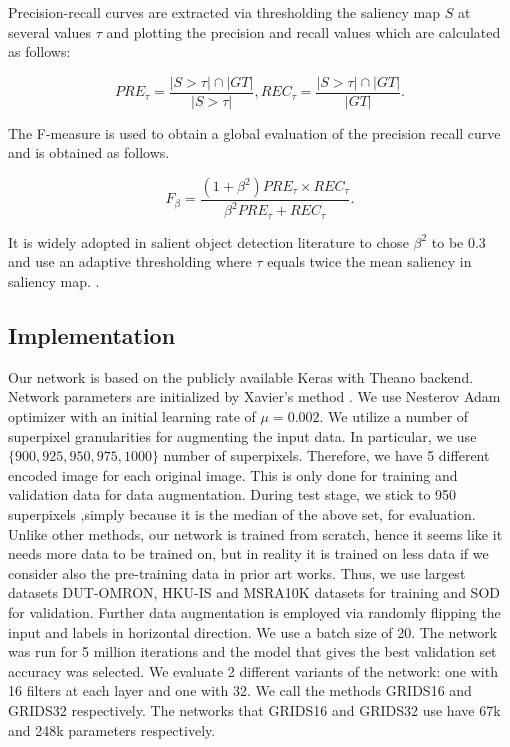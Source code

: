 \documentclass[a4paper,conference]{IEEEtran}
\begin{document}
Precision-recall curves are extracted via thresholding the saliency map $S$ at several values $\tau$ and plotting the precision and recall values which are calculated as follows:

\begin{equation}
PRE_\tau=\frac{|S>\tau|\cap|GT|}{|S>\tau|},  REC_\tau=\frac{|S>\tau|\cap|GT|}{|GT|}.
\label{eqn4}
\end{equation}

The F-measure is used to obtain a global evaluation of the precision recall curve and is obtained as follows.

\begin{equation}
F_\beta=\frac{(1+\beta^2)PRE_\tau \times REC_\tau}{\beta^2PRE_\tau+REC_\tau}.
\label{eqn5}
\end{equation}

It is widely adopted in salient object detection literature to chose $\beta^2$ to be $0.3$ and use an adaptive thresholding where $\tau$ equals twice the mean saliency in saliency map. \cite{Borji1}.

\subsection{Implementation}
Our network is based on the publicly available Keras with Theano backend.
Network parameters are initialized by Xavier's method \cite{Xavier}. 
We use Nesterov Adam optimizer with an initial learning rate of $\mu=0.002$.
We utilize a number of superpixel granularities for augmenting the input data. 
In particular, we use $\{900,925,950,975,1000\}$ number of superpixels.
Therefore, we have 5 different encoded image for each original image.
This is only done for training and validation data for data augmentation.
During test stage, we stick to 950 superpixels ,simply because it is the median of the above set, for evaluation.
Unlike other methods, our network is trained from scratch, hence it seems like it needs more data to be trained on, but in reality it is trained on less data if we consider also the pre-training data in prior art works. 
Thus, we use largest datasets DUT-OMRON, HKU-IS and MSRA10K datasets for training and SOD for validation.
Further data augmentation is employed via randomly flipping the input and labels in horizontal direction.
We use a batch size of 20.
The network was run for 5 million iterations and the model that gives the best validation set accuracy was selected.
We evaluate 2 different variants of the network: one with 16 filters at each layer and one with 32.
We call the methods GRIDS16 and GRIDS32 respectively.
The networks that GRIDS16 and GRIDS32 use have 67k and 248k parameters respectively.
\end{document}
